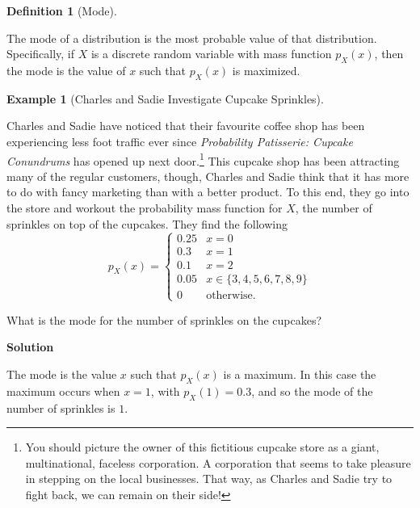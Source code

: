 \documentclass[
  letterpaper,
  DIV=11,
  numbers=noendperiod]{scrreprt}
\theoremstyle{definition}
\theoremstyle{definition}
\newtheorem{example}{Example}[chapter]
\theoremstyle{definition}
\newtheorem{definition}{Definition}[chapter]
\theoremstyle{remark}
\begin{document}
\begin{definition}[Mode]\protect\hypertarget{def-mode}{}\label{def-mode}

The mode of a distribution is the most probable value of that
distribution. Specifically, if \(X\) is a discrete random variable with
mass function \(p_X(x)\), then the mode is the value of \(x\) such that
\(p_X(x)\) is maximized.

\end{definition}

\begin{example}[Charles and Sadie Investigate Cupcake
Sprinkles]\protect\hypertarget{exm-mode}{}\label{exm-mode}

Charles and Sadie have noticed that their favourite coffee shop has been
experiencing less foot traffic ever since \emph{Probability Patisserie:
Cupcake Conundrums} has opened up next door.\footnote{You should picture
  the owner of this fictitious cupcake store as a giant, multinational,
  faceless corporation. A corporation that seems to take pleasure in
  stepping on the local businesses. That way, as Charles and Sadie try
  to fight back, we can remain on their side!} This cupcake shop has
been attracting many of the regular customers, though, Charles and Sadie
think that it has more to do with fancy marketing than with a better
product. To this end, they go into the store and workout the probability
mass function for \(X\), the number of sprinkles on top of the cupcakes.
They find the following
\[p_X(x) = \begin{cases} 0.25 & x = 0 \\ 0.3 & x = 1 \\ 0.1 & x = 2 \\ 0.05 & x \in \{3,4,5,6,7,8,9\} \\ 0 & \text{otherwise}.\end{cases}\]

What is the mode for the number of sprinkles on the cupcakes?

\begin{tcolorbox}[enhanced jigsaw, colback=white, colframe=quarto-callout-color-frame, arc=.35mm, leftrule=.75mm, rightrule=.15mm, opacityback=0, breakable, bottomrule=.15mm, left=2mm, toprule=.15mm]

\vspace{-3mm}\textbf{Solution}\vspace{3mm}

The mode is the value \(x\) such that \(p_X(x)\) is a maximum. In this
case the maximum occurs when \(x=1\), with \(p_X(1) = 0.3\), and so the
mode of the number of sprinkles is \(1\).

\end{tcolorbox}

\end{example}
\end{document}
